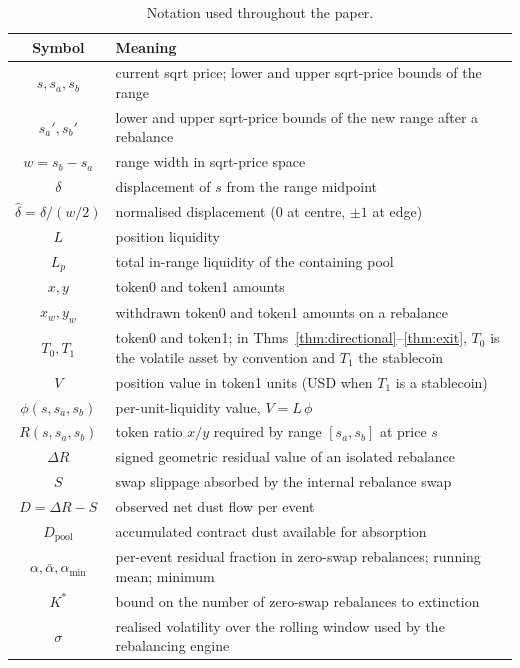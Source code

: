\documentclass[11pt,a4paper]{article}
\renewcommand{\arraystretch}{1.05}
\theoremstyle{plain}
\begin{document}
\begin{table}[H]
\centering
\caption{Notation used throughout the paper.}
\label{tab:notation}
\footnotesize
\renewcommand{\arraystretch}{1.05}
\begin{tabular}{@{}cL{10cm}@{}}
\toprule
Symbol & Meaning \\
\midrule
$s, s_a, s_b$ & current sqrt price; lower and upper sqrt-price bounds of the range \\
$s_a', s_b'$ & lower and upper sqrt-price bounds of the new range after a rebalance \\
$w = s_b - s_a$ & range width in sqrt-price space \\
$\delta$ & displacement of $s$ from the range midpoint \\
$\hat{\delta} = \delta/(w/2)$ & normalised displacement ($0$ at centre, $\pm 1$ at edge) \\
$L$ & position liquidity \\
$L_p$ & total in-range liquidity of the containing pool \\
$x, y$ & token0 and token1 amounts \\
$x_w, y_w$ & withdrawn token0 and token1 amounts on a rebalance \\
$T_0, T_1$ & token0 and token1; in Thms~\ref{thm:directional}--\ref{thm:exit}, $T_0$ is the volatile asset by convention and $T_1$ the stablecoin \\
$V$ & position value in token1 units (USD when $T_1$ is a stablecoin) \\
$\phi(s, s_a, s_b)$ & per-unit-liquidity value, $V = L\,\phi$ \\
$R(s, s_a, s_b)$ & token ratio $x/y$ required by range $[s_a, s_b]$ at price $s$ \\
$\Delta R$ & signed geometric residual value of an isolated rebalance \\
$S$ & swap slippage absorbed by the internal rebalance swap \\
$D = \Delta R - S$ & observed net dust flow per event \\
$D_{\text{pool}}$ & accumulated contract dust available for absorption \\
$\alpha, \bar\alpha, \alpha_{\min}$ & per-event residual fraction in zero-swap rebalances; running mean; minimum \\
$K^*$ & bound on the number of zero-swap rebalances to extinction \\
$\sigma$ & realised volatility over the rolling window used by the rebalancing engine \\
\bottomrule
\end{tabular}
\end{table}
\end{document}
